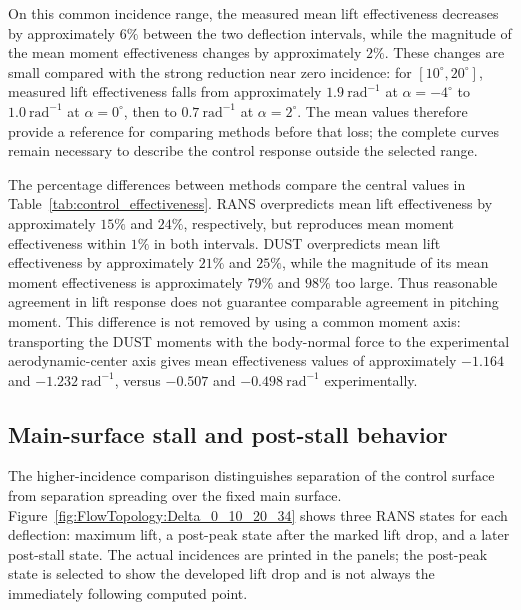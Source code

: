 \documentclass[journal ]{new-aiaa}
\begin{document}
On this common incidence range, the measured mean lift effectiveness decreases by approximately \(6\%\) between the two deflection intervals, while the magnitude of the mean moment effectiveness changes by approximately \(2\%\).
These changes are small compared with the strong reduction near zero incidence: for \([10^\circ,20^\circ]\), measured lift effectiveness falls from approximately \(1.9~\mathrm{rad}^{-1}\) at \(\alpha=-4^\circ\) to \(1.0~\mathrm{rad}^{-1}\) at \(\alpha=0^\circ\), then to \(0.7~\mathrm{rad}^{-1}\) at \(\alpha=2^\circ\).
The mean values therefore provide a reference for comparing methods before that loss; the complete curves remain necessary to describe the control response outside the selected range.

The percentage differences between methods compare the central values in Table~\ref{tab:control_effectiveness}.
RANS overpredicts mean lift effectiveness by approximately \(15\%\) and \(24\%\), respectively, but reproduces mean moment effectiveness within \(1\%\) in both intervals.
DUST overpredicts mean lift effectiveness by approximately \(21\%\) and \(25\%\), while the magnitude of its mean moment effectiveness is approximately \(79\%\) and \(98\%\) too large.
Thus reasonable agreement in lift response does not guarantee comparable agreement in pitching moment.
This difference is not removed by using a common moment axis: transporting the DUST moments with the body-normal force to the experimental aerodynamic-center axis gives mean effectiveness values of approximately \(-1.164\) and \(-1.232~\mathrm{rad}^{-1}\), versus \(-0.507\) and \(-0.498~\mathrm{rad}^{-1}\) experimentally.



\subsection{Main-surface stall and post-stall behavior}
\label{sec:main_stall_results}

The higher-incidence comparison distinguishes separation of the control surface from separation spreading over the fixed main surface.
Figure~\ref{fig:FlowTopology:Delta_0_10_20_34} shows three RANS states for each deflection: maximum lift, a post-peak state after the marked lift drop, and a later post-stall state.
The actual incidences are printed in the panels; the post-peak state is selected to show the developed lift drop and is not always the immediately following computed point.
\end{document}

